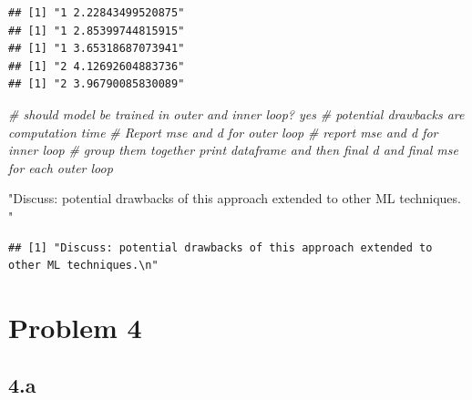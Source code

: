 \documentclass[
  11pt,
]{article}
\newenvironment{Shaded}{\begin{snugshade}}{\end{snugshade}}
\newcommand{\CommentTok}[1]{\textcolor[rgb]{0.56,0.35,0.01}{\textit{#1}}}
\newcommand{\StringTok}[1]{\textcolor[rgb]{0.31,0.60,0.02}{#1}}
\begin{document}
\begin{verbatim}
## [1] "1 2.22843499520875"
## [1] "1 2.85399744815915"
## [1] "1 3.65318687073941"
## [1] "2 4.12692604883736"
## [1] "2 3.96790085830089"
\end{verbatim}

\begin{Shaded}
\begin{Highlighting}[]
\CommentTok{\# should model be trained in outer and inner loop? yes}
\CommentTok{\# potential drawbacks are computation time}
\CommentTok{\# Report mse and d for outer loop}
\CommentTok{\# report mse and d for inner loop}
\CommentTok{\# group them together print dataframe and then final d and final mse for each outer loop}

\StringTok{"Discuss: potential drawbacks of this approach extended to other ML techniques.}
\StringTok{"}
\end{Highlighting}
\end{Shaded}

\begin{verbatim}
## [1] "Discuss: potential drawbacks of this approach extended to other ML techniques.\n"
\end{verbatim}

\hypertarget{problem-4}{%
\section{Problem 4}\label{problem-4}}

\hypertarget{a}{%
\subsection{4.a}\label{a}}
\end{document}
